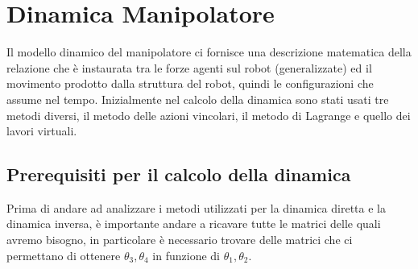 \section{Dinamica Manipolatore}
Il modello dinamico del manipolatore ci fornisce una descrizione matematica della relazione che è instaurata tra le forze agenti sul robot (generalizzate) ed il movimento prodotto dalla struttura del robot, quindi le configurazioni che assume nel tempo. Inizialmente nel calcolo della dinamica sono stati usati tre metodi diversi, il metodo delle azioni vincolari, il metodo di Lagrange e quello dei lavori virtuali.
\subsection{Prerequisiti per il calcolo della dinamica}\label{sec:prerequisiti-dinamica}
Prima di andare ad analizzare i metodi utilizzati per la dinamica diretta e la dinamica inversa, è importante andare a ricavare tutte le matrici delle quali avremo bisogno, in particolare è necessario trovare delle matrici che ci permettano di ottenere $\theta_3, \theta_4$ in funzione di $\theta_1, \theta_2$.
